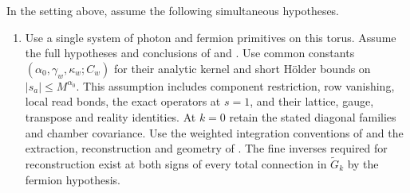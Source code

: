 \documentclass[11pt,letterpaper,reqno]{amsart}
\begin{document}
\begin{theorem}\label{thm:rgnl-current-step}
In the setting above, assume the following simultaneous hypotheses.
\begin{enumerate}[label=\textup{(\roman*)},leftmargin=*]
\item Use a single system of photon and fermion primitives on this
torus. Assume the full hypotheses and conclusions of
\cite[Theorems~A--B and Proposition~5.1]{MaxwellBlockManuscript}
and
\cite[Theorem~A, Propositions~4.1,
4.2,
4.3,
6.1 and
6.2]{FermionBlockManuscript}.
Use common constants $(\alpha_0,\gamma_w,\kappa_w;C_w)$ for their
analytic kernel and short H\"older bounds on
$|s_a|\le M^{\alpha_0}$. This assumption includes component
restriction, row vanishing, local read bonds, the exact operators at
$s=1$, and their lattice, gauge, transpose and reality identities.
At $k=0$ retain the stated diagonal families and chamber covariance.
Use the weighted integration conventions of
\cite[Theorem~B and Proposition~5.1]{FermionBlockManuscript}
and the extraction, reconstruction and geometry of
\cite[Theorems~A--B and Appendix~B]{NormalizedContraction}.
The fine inverses required for reconstruction exist at both signs
of every total connection in $\widetilde G_k$ by the fermion hypothesis.


\end{enumerate}
\end{theorem}
\end{document}
